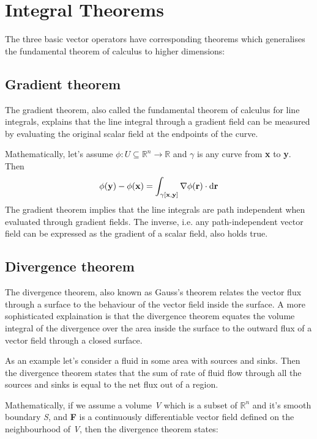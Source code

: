 \section{Integral Theorems}
The three basic vector operators have corresponding theorems which generalises the fundamental theorem of calculus to higher dimensions:

\subsection{Gradient theorem}
The gradient theorem, also called the fundamental theorem of calculus for line integrals, explains that the line integral through a gradient field can be measured by evaluating the original scalar field at the endpoints of the curve.

Mathematically, let's assume $ \phi: U \subseteq \mathbb{R}^{n} \rightarrow \mathbb{R} $ and $ \gamma $ is any curve from \textbf{x} to \textbf{y}. Then
\begin{equation}
	\phi(\textbf{y}) - \phi(\textbf{x}) = \int_{\gamma [\textbf{x}, \textbf{y}]} \nabla \phi(\textbf{r})\cdot \mathop{}\!\mathrm{d} \textbf{r}
\end{equation}
The gradient theorem implies that the line integrals are path independent when evaluated through gradient fields. The inverse, i.e. any path-independent vector field can be expressed as the gradient of a scalar field, also holds true.

\subsection{Divergence theorem}
The divergence theorem, also known as Gauss's theorem relates the vector flux through a surface to the behaviour of the vector field inside the surface. A more sophisticated explaination is that the divergence theorem equates the volume integral of the divergence over the area inside the surface to the outward flux of a vector field through a closed surface. 

As an example let's consider a fluid in some area with sources and sinks. Then the divergence theorem states that the sum of rate of fluid flow through all the sources and sinks is equal to the net flux out of a region. 

Mathematically, if we assume a volume \textit{V} which is a subset of $ \mathbb{R}^{n} $ and it's smooth boundary \textit{S}, and \textbf{F} is a continuously differentiable vector field defined on the neighbourhood of \textit{V}, then the divergence theorem states:

